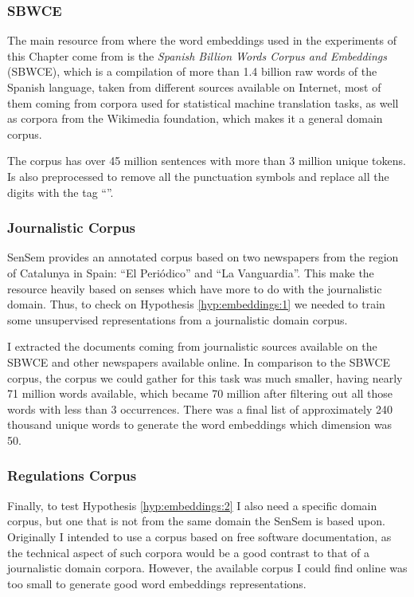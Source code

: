 \subsubsection{SBWCE}\label{sec:embeddings:sbwce}

The main resource from where the word embeddings used in the experiments of
this Chapter come from is the {\em Spanish Billion Words Corpus and Embeddings}
\cite{cardellinoSBWCE} (SBWCE), which is a compilation of more than 1.4 billion
raw words of the Spanish language, taken from different sources available on
Internet, most of them coming from corpora used for statistical machine
translation tasks, as well as corpora from the Wikimedia foundation, which
makes it a general domain corpus.

The corpus has over 45 million sentences with more than 3 million unique
tokens. Is also preprocessed to remove all the punctuation symbols and replace
all the digits with the tag ``\digito''.

\subsubsection{Journalistic Corpus}\label{sec:embeddings:journal}

SenSem provides an annotated corpus based on two newspapers from the region of
Catalunya in Spain: ``El Peri\'odico'' and ``La Vanguardia''. This make the
resource heavily based on senses which have more to do with the journalistic
domain. Thus, to check on Hypothesis \ref{hyp:embeddings:1} we needed to
train some unsupervised representations from a journalistic domain corpus.

I extracted the documents coming from journalistic sources available on the
SBWCE and other newspapers available online. In comparison to the SBWCE
corpus, the corpus we could gather for this task was much smaller, having
nearly 71 million words available, which became 70 million after filtering out
all those words with less than 3 occurrences. There was a final list of
approximately 240 thousand unique words to generate the word embeddings which
dimension was 50.

\subsubsection{Regulations Corpus}

Finally, to test Hypothesis \ref{hyp:embeddings:2} I also need a specific
domain corpus, but one that is not from the same domain the SenSem is based
upon. Originally I intended to use a corpus based on free software
documentation, as the technical aspect of such corpora would be a good contrast
to that of a journalistic domain corpora. However, the available corpus I could
find online was too small to generate good word embeddings representations.

